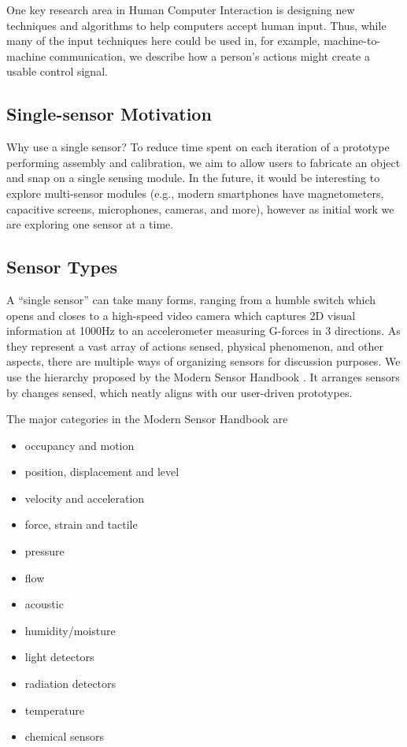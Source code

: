 One key research area in Human Computer Interaction is designing new techniques and algorithms to help computers accept human input. Thus, while many of the input techniques here could be used in, for example, machine-to-machine communication, we describe how a person's actions might create a usable control signal.

\subsection{Single-sensor Motivation}

Why use a single sensor? To reduce time spent on each iteration of a prototype performing assembly and calibration, we aim to allow users to fabricate an object and snap on a single sensing module. In the future, it would be interesting to explore multi-sensor modules (e.g., modern smartphones have magnetometers, capacitive screens, microphones, cameras, and more), however as initial work we are exploring one sensor at a time.

\subsection{Sensor Types}

A ``single sensor'' can take many forms, ranging from a humble switch which opens and closes to a high-speed video camera which captures 2D visual information at 1000Hz to an accelerometer measuring G-forces in 3 directions.
As they represent a vast array of actions sensed, physical phenomenon, and other aspects, there are multiple ways of organizing sensors for discussion purposes. We use the hierarchy proposed by the Modern Sensor Handbook \cite{fraden-modernsensors}. It arranges sensors by changes sensed, which neatly aligns with our user-driven prototypes.

The major categories in the Modern Sensor Handbook are
\begin{itemize}
    \item occupancy and motion
    \item position, displacement and level
    \item velocity and acceleration
    \item force, strain and tactile
    \item pressure
    \item flow
    \item acoustic
    \item humidity/moisture
    \item light detectors
    \item radiation detectors
    \item temperature
    \item chemical sensors
\end{itemize}


